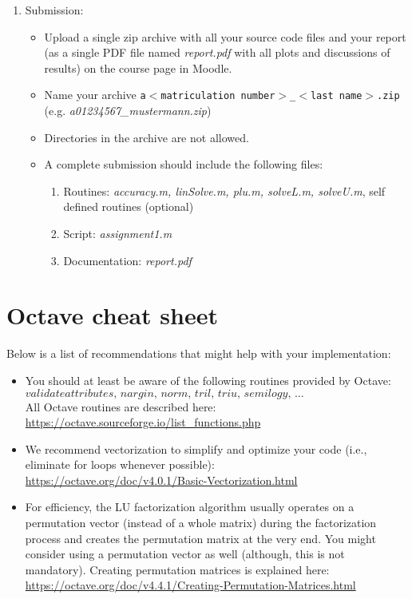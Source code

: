 \documentclass{scrartcl}
\begin{document}
\begin{enumerate}
	\item Submission:	
	\begin{itemize}		
		\item  Upload a single zip archive with all your source code files and your report (as a single
			PDF file named \textit{report.pdf} with all plots and discussions of results) on the course page in Moodle.
		\item Name your archive \texttt{a$<$matriculation number$>$\_$<$last name$>$.zip}\\
		(e.g. \textit{a01234567\_mustermann.zip})
		\item Directories in the archive are not allowed.
		\item A complete submission should include the following files:
		\begin{enumerate}
		\item Routines: \textit{accuracy.m, linSolve.m, plu.m, solveL.m, solveU.m}, self defined routines (optional)
		\item Script: \textit{assignment1.m}
		\item Documentation: \textit{report.pdf}
		\end{enumerate}
		
		\end{itemize}
	\end{enumerate}

\section*{Octave cheat sheet}
Below is a list of recommendations that might help with your implementation:
\begin{itemize}

\item You should at least be aware of the following routines provided by Octave:\\

$validateattributes,\,nargin,\,norm,\,tril,\,triu,\,semilogy,\,\ldots$\\

All Octave routines are described here:\\
\url{https://octave.sourceforge.io/list_functions.php}

\item We recommend vectorization to simplify and optimize your code (i.e., eliminate for loops whenever possible):\vspace{.3cm}\\
\url{https://octave.org/doc/v4.0.1/Basic-Vectorization.html}

\item For efficiency, the LU factorization algorithm usually operates on a permutation vector (instead of a whole matrix) during the factorization process and creates the permutation matrix at the very end. You might consider using a permutation vector as well (although, this is not mandatory). Creating permutation matrices is explained here:\vspace{.3cm}\\
\url{https://octave.org/doc/v4.4.1/Creating-Permutation-Matrices.html}


\end{itemize}
\end{document}
